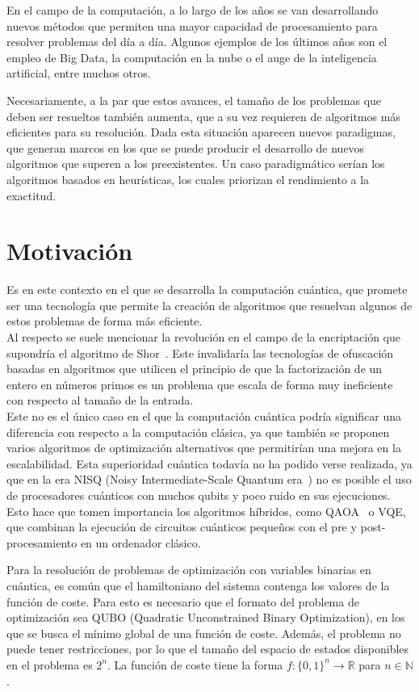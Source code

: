 En el campo de la computación, a lo largo de los años se van desarrollando nuevos métodos que permiten una mayor capacidad de procesamiento para resolver problemas del día a día.
Algunos ejemplos de los últimos años son el empleo de Big Data, la computación en la nube o el auge de la inteligencia artificial, entre muchos otros.

Necesariamente, a la par que estos avances, el tamaño de los problemas que deben ser resueltos también aumenta, que a su vez requieren de algoritmos más eficientes para su resolución.
Dada esta situación aparecen nuevos paradigmas, que generan marcos en los que se puede producir el desarrollo de nuevos algoritmos que superen a los preexistentes.
Un caso paradigmático serían los algoritmos basados en heurísticas, los cuales priorizan el rendimiento a la exactitud.

\section{Motivación}

Es en este contexto en el que se desarrolla la computación cuántica, que promete ser una tecnología que permite la creación de algoritmos que resuelvan algunos de estos problemas de forma más eficiente.
\\
Al respecto se suele mencionar la revolución en el campo de la encriptación que supondría el algoritmo de Shor~\cite{Shor_algorithm}.
Este invalidaría las tecnologías de ofuscación basadas en algoritmos que utilicen el principio de que la factorización de un entero en números primos es un problema que escala de forma muy ineficiente con respecto al tamaño de la entrada.
\\
Este no es el único caso en el que la computación cuántica podría significar una diferencia con respecto a la computación clásica,
ya que también se proponen varios algoritmos de optimización alternativos que permitirían una mejora en la escalabilidad.
Esta superioridad cuántica todavía no ha podido verse realizada, ya que en la era NISQ (Noisy Intermediate-Scale Quantum era~\cite{Quantum_computing_in_the_NISQ_era_and_beyond}) no es posible el uso de procesadores cuánticos con muchos qubits y poco ruido  %
en sus ejecuciones.
Esto hace que tomen importancia los algoritmos híbridos, como QAOA~\cite{qaoa_paper_original} o VQE, que combinan la ejecución de circuitos cuánticos pequeños con el pre y post-procesamiento en un ordenador clásico.

Para la resolución de problemas de optimización con variables binarias en cuántica, es común que el hamiltoniano del sistema contenga los valores de la función de coste.
Para esto es necesario que el formato del problema de optimización sea QUBO (Quadratic Unconstrained Binary Optimization), en los que se busca el mínimo global de una función de coste.
Además, el problema no puede tener restricciones, por lo que el tamaño del espacio de estados disponibles en el problema es $2^n$.
La función de coste tiene la forma $f: {\{0, 1\}}^n \rightarrow \mathbb{R}$ para $n \in \mathbb{N}$.


